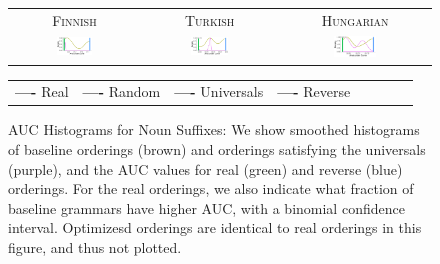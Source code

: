 \documentclass[11pt,letterpaper]{article}
\begin{document}
\begin{figure}
\begin{center}
\begin{tabular}{ccc}
\textsc{Finnish} & \textsc{Turkish} & \textsc{Hungarian} \\
    \includegraphics[width=0.3\textwidth]{figures/finnish_nouns/suffixes-byMorphemes-auc-hist-heldout-Coarse-FineSurprisal-optimized.pdf}
    &
    \includegraphics[width=0.3\textwidth]{figures/turkish_nouns/suffixes-byMorphemes-auc-hist-heldout-Coarse-FineSurprisal-optimized.pdf}
    &
    \includegraphics[width=0.3\textwidth]{figures/hungarian_nouns/suffixes-byMorphemes-auc-hist-heldout-Coarse-FineSurprisal-optimized.pdf}
    \end{tabular}
    
    \begin{tabular}{llllllll}
\textbf{\textcolor{real}{----}} Real&
\textbf{\textcolor{random}{----}} Random&
\textbf{\textcolor{universals}{----}} Universals&
\textbf{\textcolor{reverse}{----}} Reverse
\end{tabular}
\end{center}
    
    \caption{AUC Histograms for Noun Suffixes: We show smoothed histograms of baseline orderings (brown) and orderings satisfying the universals (purple), and the AUC values for real (green) and reverse (blue) orderings. For the real orderings, we also indicate what fraction of baseline grammars have higher AUC, with a binomial confidence interval. Optimizesd orderings are identical to real orderings in this figure, and thus not plotted.  }
    \label{fig:auc_nouns}
\end{figure}
\end{document}
